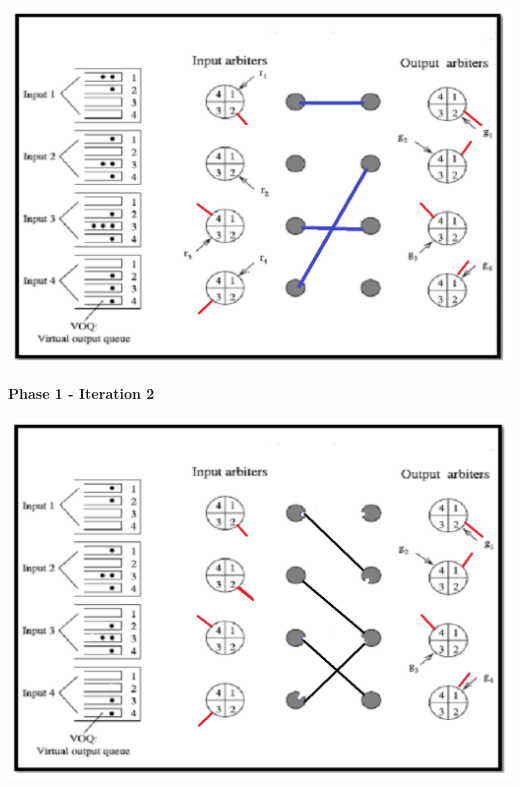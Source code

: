 \begin{qsolve}
	\begin{latin}
		
		\begin{center}
			\includegraphics*[width=0.7\linewidth]{pics/img7.png}
		\end{center}
		
		
		\textbf{Phase 1 - Iteration 2}\\
		\begin{center}
			\includegraphics*[width=0.7\linewidth]{pics/img8.png}
		\end{center}
		
	\end{latin}
\end{qsolve}
\newpage



